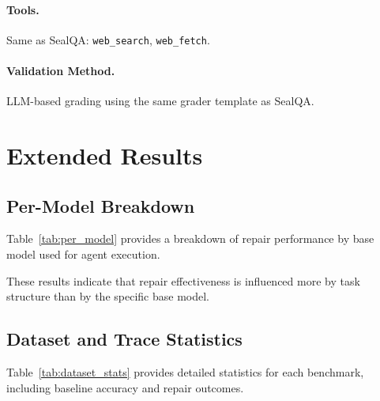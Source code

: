 \documentclass{article}
\theoremstyle{plain}
\theoremstyle{definition}
\theoremstyle{remark}
\begin{document}
\paragraph{Tools.}
Same as SealQA: \texttt{web\_search}, \texttt{web\_fetch}.

\paragraph{Validation Method.}
LLM-based grading using the same grader template as SealQA.

\section{Extended Results}

\subsection{Per-Model Breakdown}

Table~\ref{tab:per_model} provides a breakdown of repair performance by base model used for agent execution.

\begin{table}[h]
  \caption{Repair performance broken down by base model.}
  \label{tab:per_model}
  \centering
\end{table}

These results indicate that repair effectiveness is influenced more by task structure than by the specific base model.

\subsection{Dataset and Trace Statistics}

Table~\ref{tab:dataset_stats} provides detailed statistics for each benchmark, including baseline accuracy and repair outcomes.
\end{document}
